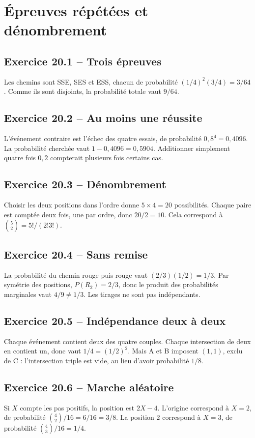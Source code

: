 \chapter{Épreuves répétées et dénombrement}
\section*{Exercice 20.1 -- Trois épreuves}
Les chemins sont SSE, SES et ESS, chacun de probabilité $(1/4)^2(3/4)=3/64$. Comme ils sont disjoints, la probabilité totale vaut $9/64$.

\section*{Exercice 20.2 -- Au moins une réussite}
L'événement contraire est l'échec des quatre essais, de probabilité $0{,}8^4=0{,}4096$. La probabilité cherchée vaut $1-0{,}4096=0{,}5904$. Additionner simplement quatre fois $0{,}2$ compterait plusieurs fois certains cas.

\section*{Exercice 20.3 -- Dénombrement}
Choisir les deux positions dans l'ordre donne $5\times4=20$ possibilités. Chaque paire est comptée deux fois, une par ordre, donc $20/2=10$. Cela correspond à $\binom52=5!/(2!3!)$.

\section*{Exercice 20.4 -- Sans remise}
La probabilité du chemin rouge puis rouge vaut $(2/3)(1/2)=1/3$. Par symétrie des positions, $P(R_2)=2/3$, donc le produit des probabilités marginales vaut $4/9\ne1/3$. Les tirages ne sont pas indépendants.

\section*{Exercice 20.5 -- Indépendance deux à deux}
Chaque événement contient deux des quatre couples. Chaque intersection de deux en contient un, donc vaut $1/4=(1/2)^2$. Mais A et B imposent $(1,1)$, exclu de C : l'intersection triple est vide, au lieu d'avoir probabilité $1/8$.

\section*{Exercice 20.6 -- Marche aléatoire}
Si $X$ compte les pas positifs, la position est $2X-4$. L'origine correspond à $X=2$, de probabilité $\binom42/16=6/16=3/8$. La position $2$ correspond à $X=3$, de probabilité $\binom43/16=1/4$.

